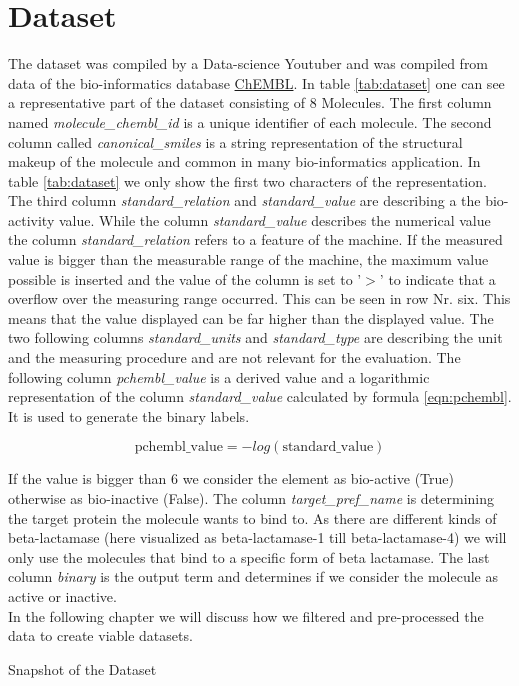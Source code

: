 \documentclass[12pt]{article}
\begin{document}
\section{Dataset}\label{sec:Dataset}
The dataset was compiled by a Data-science Youtuber and was compiled from data of the bio-informatics database \href{https://www.ebi.ac.uk/chembl/}{ChEMBL}. In table \ref{tab:dataset} one can see a representative part of the dataset consisting of 8 Molecules. The first column named \textit{molecule\_chembl\_id} is a unique identifier of each molecule. The second column called \textit{canonical\_smiles} is a string representation of the structural makeup of the molecule and common in many bio-informatics application. In table \ref{tab:dataset} we only show the first two characters of the representation. The third column \textit{standard\_relation} and \textit{standard\_value} are describing a
the bio-activity value. While the column \textit{standard\_value} describes the numerical value the column \textit{standard\_relation} refers to a feature of the machine. If the measured value is bigger than the measurable range of the machine, the maximum value possible is inserted and the value of the column is set to '$>$' to indicate that a overflow over the measuring range occurred. This can be seen in row Nr. six. This means that the value displayed can be far higher than the displayed value. The two following columns \textit{standard\_units} and \textit{standard\_type} are describing the unit and the measuring procedure and are not relevant for the evaluation. The following column \textit{pchembl\_value} is a derived value and a logarithmic representation of the column \textit{standard\_value} calculated by formula \ref{eqn:pchembl}. It is used to generate the binary labels.

\begin{equation}
\label{eqn:pchembl}
\text{pchembl\_value}=-log(\text{standard\_value})
\end{equation}

 If the value is bigger than 6 we consider the element as bio-active (True) otherwise as bio-inactive (False). The column \textit{target\_pref\_name} is determining the target protein the molecule wants to bind to. As there are different kinds of beta-lactamase (here visualized as beta-lactamase-1 till beta-lactamase-4) we will only use the molecules that bind to a specific form of beta lactamase. The last column \textit{binary} is the output term and determines if we consider the molecule as active or inactive.\\ In the following chapter we will discuss how we filtered and pre-processed the data to create viable datasets. 
\begin{table}[t]
\centering

\caption{Snapshot of the Dataset}
\label{tab:dataset}
\end{table}
\end{document}
